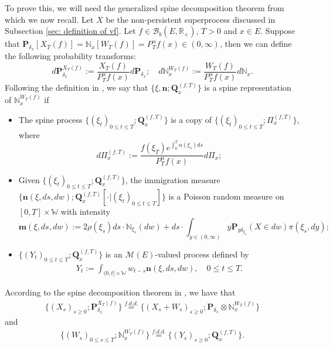 \documentclass[12pt,a4paper]{amsart}
\theoremstyle{plain}
\theoremstyle{definition}
\numberwithin{equation}{section}
\begin{document}
    To prove this, we will need the generalized spine decomposition theorem from \cite{RenSongSun2017Spine} which we now recall.
    Let $X$ be the non-persistent superprocess discussed in Subsection \ref{sec: definition of vf}.
    Let $f\in \mathcal B_b(E,\mathbb R_+)$, $T >0$ and $x\in E$.
    Suppose that $\mathbf P_{\delta_x}[X_T(f)] = \mathbb N_x[W_T(f)] = P^\alpha_T f(x) \in (0,\infty)$, then we can define the following probability transforms:
\begin{equation}
    d\mathbf P_{\delta_x}^{X_T(f)}
   := \frac{X_T(f)}{P_T^\alpha f(x)} d\mathbf P_{\delta_x};
    \quad d\mathbb N_x^{W_T(f)}
    :=  \frac{W_T(f)}{P_T^\alpha f(x)} d\mathbb N_x.
\end{equation}
    Following the definition in \cite{RenSongSun2017Spine}, we say that $\{\xi, \mathbf n;\mathbf Q_{x}^{(f,T)}\}$ is a spine representation of $\mathbb N_x^{W_T(f)}$ if
\begin{itemize}
\item
    The spine process $\{(\xi_t)_{0\leq t\leq T}; \mathbf Q^{(f,T)}_x\}$ is a copy of $\{(\xi_t)_{0\leq t\leq T}; \Pi^{(f,T)}_{x}\}$,
    where
\begin{equation}
    d\Pi_x^{(f,T)} := \frac{f(\xi_T)e^{\int_0^T \alpha(\xi_s)ds}}{P^\alpha_T f(x)} d \Pi_x;
\end{equation}
\item
    Given $\{(\xi_t)_{0\leq t\leq T}; \mathbf Q^{(f,T)}_x\}$, the immigration measure $\{\mathbf n(\xi,ds,dw); \mathbf Q^{(f,T)}_x[\cdot |(\xi_t)_{0\leq t\leq T}]\}$ is a Poisson random measure on $[0,T] \times \mathbb W$ with intensity
\begin{equation}
\label{eq: conditional intensity}
    \mathbf m(\xi,ds,dw)
    := 2 \rho(\xi_s) ds \cdot \mathbb N_{\xi_s}(dw) + ds \cdot \int_{y\in (0,\infty)} y \mathbf P_{y\delta_{\xi_s}}(X\in dw) \pi(\xi_s,dy);
\end{equation}
\item
    $\{(Y_t)_{0\leq t\leq T}; \mathbf Q^{(f,T)}_x\}$ is an $\mathcal M(E)$-valued process defined by
\begin{equation}\begin{split}
    Y_t
    := \int_{(0,t] \times \mathbb W} w_{t-s} \mathbf n(\xi,ds,dw),
    \quad 0 \leq t\leq T.
\end{split}\end{equation}
\end{itemize}
    According to the spine decomposition theorem in \cite{RenSongSun2017Spine}, we have that
\begin{equation}\begin{split}
\label{eq: Spine decomposition 1}
    \{(X_s)_{s \geq 0};\mathbf P_{\delta_x}^{X_T(f)}\}
    \overset{f.d.d.}{=} \{(X_s + W_s)_{s \geq 0};\mathbf P_{\delta_x} \otimes \mathbb N_x^{W_T(f)} \}
\end{split}\end{equation}
    and
\begin{equation}\begin{split}
\label{eq: Spine decomposition 2}
    \{(W_s)_{0\leq s\leq T};\mathbb N_x^{W_T(f)}\}
    \overset{f.d.d.}{=} \{(Y_s)_{s \geq 0};\mathbf Q_x^{(f,T)}\}.
\end{split}\end{equation}
\end{document}

